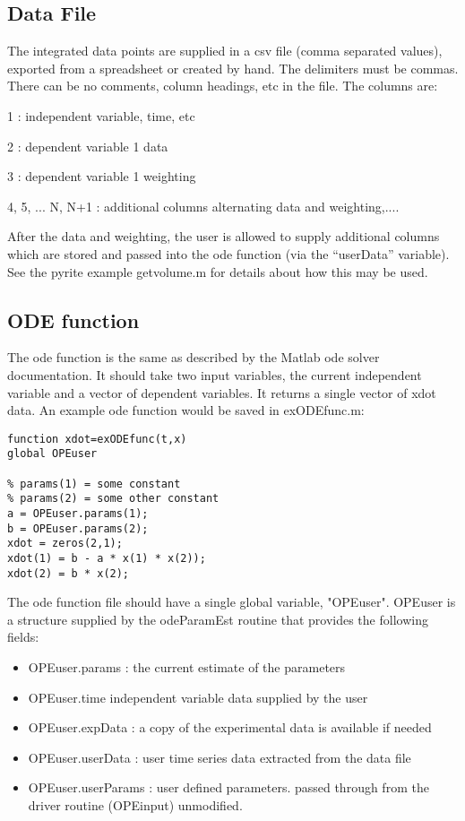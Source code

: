 \documentclass[10pt]{article}
\theoremstyle{plain}
\begin{document}
\subsection{Data File}
The integrated data points are supplied in a csv file (comma separated
values), exported from a spreadsheet or created by hand. The
delimiters must be commas. There can be no comments, column headings,
etc in the file. The columns are:

1 : independent variable, time, etc

2 : dependent variable 1 data

3 : dependent variable 1 weighting

4, 5, ... N, N+1 : additional columns alternating data and weighting,....

After the data and weighting, the user is allowed to supply additional
columns which are stored and passed into the ode function (via the
``userData'' variable). See the pyrite example getvolume.m for details
about how this may be used.


\subsection{ODE function}
The ode function is the same as described by the Matlab ode solver
documentation. It should take two input variables, the current
independent variable and a vector of dependent variables. It returns a
single vector of xdot data. An example ode function would be saved in
exODEfunc.m:
\begin{verbatim}
function xdot=exODEfunc(t,x)
global OPEuser

% params(1) = some constant
% params(2) = some other constant
a = OPEuser.params(1);
b = OPEuser.params(2);
xdot = zeros(2,1);
xdot(1) = b - a * x(1) * x(2));
xdot(2) = b * x(2);
\end{verbatim}

The ode function file should have a single global variable,
"OPEuser". OPEuser is a structure supplied by the odeParamEst routine
that provides the following fields:

\begin{itemize}
\item OPEuser.params : the current estimate of the parameters
\item OPEuser.time independent variable data supplied by the user
\item OPEuser.expData : a copy of the experimental data is available if needed
\item OPEuser.userData : user time series data extracted from the data file
\item OPEuser.userParams : user defined parameters. passed through
from the driver routine (OPEinput) unmodified.
\end{itemize}
\end{document}
